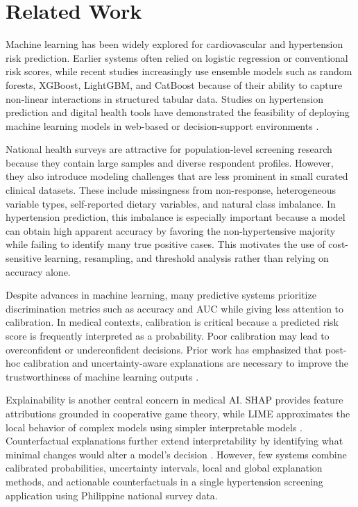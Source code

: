 \documentclass[journal]{IEEEtran}
\begin{document}
\section{Related Work}
Machine learning has been widely explored for cardiovascular and hypertension risk prediction. Earlier systems often relied on logistic regression or conventional risk scores, while recent studies increasingly use ensemble models such as random forests, XGBoost, LightGBM, and CatBoost because of their ability to capture non-linear interactions in structured tabular data. Studies on hypertension prediction and digital health tools have demonstrated the feasibility of deploying machine learning models in web-based or decision-support environments \cite{naik2025artificial,pandey2025development}.

National health surveys are attractive for population-level screening research because they contain large samples and diverse respondent profiles. However, they also introduce modeling challenges that are less prominent in small curated clinical datasets. These include missingness from non-response, heterogeneous variable types, self-reported dietary variables, and natural class imbalance. In hypertension prediction, this imbalance is especially important because a model can obtain high apparent accuracy by favoring the non-hypertensive majority while failing to identify many true positive cases. This motivates the use of cost-sensitive learning, resampling, and threshold analysis rather than relying on accuracy alone.

Despite advances in machine learning, many predictive systems prioritize discrimination metrics such as accuracy and AUC while giving less attention to calibration. In medical contexts, calibration is critical because a predicted risk score is frequently interpreted as a probability. Poor calibration may lead to overconfident or underconfident decisions. Prior work has emphasized that post-hoc calibration and uncertainty-aware explanations are necessary to improve the trustworthiness of machine learning outputs \cite{lofstrom2023primer,lofstrom2024calibrated_uncertainty}.

Explainability is another central concern in medical AI. SHAP provides feature attributions grounded in cooperative game theory, while LIME approximates the local behavior of complex models using simpler interpretable models \cite{shap,ribeiro2016lime}. Counterfactual explanations further extend interpretability by identifying what minimal changes would alter a model's decision \cite{wachter2017counterfactual}. However, few systems combine calibrated probabilities, uncertainty intervals, local and global explanation methods, and actionable counterfactuals in a single hypertension screening application using Philippine national survey data.
\end{document}
